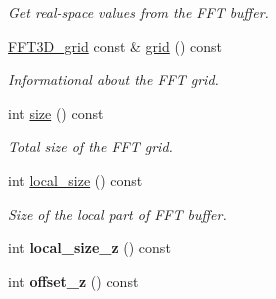 \begin{DoxyCompactItemize}
\begin{DoxyCompactList}\small\item\em Get real-\/space values from the F\+F\+T buffer. \end{DoxyCompactList}\item 
\hyperlink{classsddk_1_1_f_f_t3_d__grid}{F\+F\+T3\+D\+\_\+grid} const \& \hyperlink{classsddk_1_1_f_f_t3_d_aafa864d225eb5284f5b0a53946018f65}{grid} () const 
\begin{DoxyCompactList}\small\item\em Informational about the F\+F\+T grid. \end{DoxyCompactList}\item 
int \hyperlink{classsddk_1_1_f_f_t3_d_a76862dd8ff5e94aece9e8c9f23201d25}{size} () const 
\begin{DoxyCompactList}\small\item\em Total size of the F\+F\+T grid. \end{DoxyCompactList}\item 
int \hyperlink{classsddk_1_1_f_f_t3_d_aecd9956c7995684814095671e9c4da90}{local\+\_\+size} () const 
\begin{DoxyCompactList}\small\item\em Size of the local part of F\+F\+T buffer. \end{DoxyCompactList}\item 
\hypertarget{classsddk_1_1_f_f_t3_d_af3acc4fd77a6ac884680b8beaa794d08}{}int {\bfseries local\+\_\+size\+\_\+z} () const \label{classsddk_1_1_f_f_t3_d_af3acc4fd77a6ac884680b8beaa794d08}

\item 
\hypertarget{classsddk_1_1_f_f_t3_d_a59b230d9f788dd2e33951654935e5672}{}int {\bfseries offset\+\_\+z} () const \label{classsddk_1_1_f_f_t3_d_a59b230d9f788dd2e33951654935e5672}


\end{DoxyCompactItemize}

